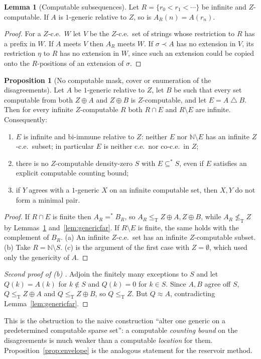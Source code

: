 \documentclass[11pt,letterpaper]{article}
\theoremstyle{definition}
\newtheorem{proposition}[definition]{Proposition}
\newtheorem{lemma}[definition]{Lemma}
\numberwithin{equation}{section}
\newcommand{\N}{\mathbb N}
\newcommand{\leT}{\le_{\mathrm T}}
\newcommand{\nleT}{\nleq_{\mathrm T}}
\newcommand{\sd}{\mathbin{\triangle}}
\newcommand{\src}[1]{\leavevmode{\sffamily\footnotesize\color{Steel}[#1]}}
\newenvironment{proofA}[1]{\begin{proof}[#1]}{\end{proof}}
\begin{document}
\begin{lemma}[Computable subsequences]\label{lem:subsequence}\src{R7}
Let $R=\{r_0<r_1<\cdots\}$ be infinite and $Z$-computable. If $A$ is $1$-generic relative to $Z$, so is $A_R(n)=A(r_n)$.
\end{lemma}
\begin{proof}
For a $Z$-c.e.\ $W$ let $V$ be the $Z$-c.e.\ set of strings whose restriction to $R$ has a prefix in $W$. If $A$ meets $V$ then $A_R$ meets $W$. If $\sigma\prec A$ has no extension in $V$, its restriction $\eta$ to $R$ has no extension in $W$, since such an extension could be copied onto the $R$-positions of an extension of $\sigma$.
\end{proof}

\begin{proposition}[No computable mask, cover or enumeration of the disagreements]\label{prop:mask}\src{R2, R6, R7}
Let $A$ be $1$-generic relative to $Z$, let $B$ be such that every set computable from both $Z\oplus A$ and $Z\oplus B$ is $Z$-computable, and let $E=A\sd B$. Then for every infinite $Z$-computable $R$ both $R\cap E$ and $R\setminus E$ are infinite. Consequently:
\begin{enumerate}[label=\textup{(\alph*)}]
\item $E$ is infinite and bi-immune relative to $Z$: neither $E$ nor $\N\setminus E$ has an infinite $Z$-c.e.\ subset; in particular $E$ is neither c.e.\ nor co-c.e.\ in $Z$;
\item there is no $Z$-computable density-zero $S$ with $E\subseteq^*S$, even if $E$ satisfies an explicit computable counting bound;
\item if $Y$ agrees with a $1$-generic $X$ on an infinite computable set, then $X,Y$ do not form a minimal pair.
\end{enumerate}
\end{proposition}
\begin{proof}
If $R\cap E$ is finite then $A_R=^*B_R$, so $A_R\leT Z\oplus A,Z\oplus B$, while $A_R\nleT Z$ by Lemmas~\ref{lem:subsequence} and~\ref{lem:genericfar}. If $R\setminus E$ is finite, the same holds with the complement of $B_R$. (a) An infinite $Z$-c.e.\ set has an infinite $Z$-computable subset. (b) Take $R=\N\setminus S$. (c) is the argument of the first case with $Z=\emptyset$, which used only the genericity of $A$.
\end{proof}
\begin{proofA}{Second proof of \textup{(b)} \src{R2}}
Adjoin the finitely many exceptions to $S$ and let $Q(k)=A(k)$ for $k\notin S$ and $Q(k)=0$ for $k\in S$. Since $A,B$ agree off $S$, $Q\leT Z\oplus A$ and $Q\leT Z\oplus B$, so $Q\leT Z$. But $Q\approx A$, contradicting Lemma~\ref{lem:genericfar}.
\end{proofA}
This is the obstruction to the naive construction ``alter one generic on a predetermined computable sparse set'': a computable \emph{counting bound} on the disagreements is much weaker than a computable \emph{location} for them. Proposition~\ref{prop:envelope} is the analogous statement for the reservoir method.
\end{document}
